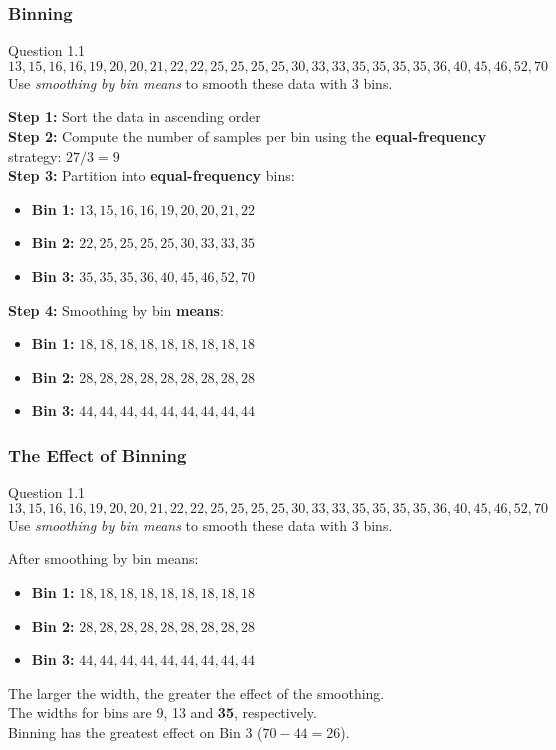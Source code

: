 \documentclass[aspectratio=169, 10pt]{beamer}
\begin{document}
\begin{frame}[t]
    \frametitle{Binning}
    \small

    \begin{block}{Question 1.1}
        \[13,15,16,16,19,20,20,21,22,22,25,25,25,25,30,33,33,35,35,35,35,36,40,45,46,52,70\]
        Use \textit{smoothing by bin means} to smooth these data with 3 bins.
    \end{block}
    \textbf{Step 1:} Sort the data in ascending order \\
    \textbf{Step 2:} Compute the number of samples per bin using the \textbf{equal-frequency} strategy: $27/3=9$\\
    \textbf{Step 3:} Partition into \textbf{equal-frequency} bins:

    \begin{itemize}
        \item \textbf{Bin 1:} $13,15,16,16,19,20,20,21,22$
        \item \textbf{Bin 2:} $22,25,25,25,25,30,33,33,35$
        \item \textbf{Bin 3:} $35,35,35,36,40,45,46,52,70$
    \end{itemize}

    \textbf{Step 4:} Smoothing by bin \textbf{means}:

    \begin{itemize}
        \item \textbf{Bin 1:} $18, 18, 18, 18, 18, 18, 18, 18, 18$
        \item \textbf{Bin 2:} $28, 28, 28, 28, 28, 28, 28, 28, 28$
        \item \textbf{Bin 3:} $44, 44, 44, 44, 44, 44, 44, 44, 44$
    \end{itemize}
\end{frame}

\begin{frame}[t]
    \frametitle{The Effect of Binning}

    \begin{block}{Question 1.1}
        \[13,15,16,16,19,20,20,21,22,22,25,25,25,25,30,33,33,35,35,35,35,36,40,45,46,52,70\]
        Use \textit{smoothing by bin means} to smooth these data with 3 bins.
    \end{block}

    After smoothing by bin means:
    \begin{itemize}
        \item \textbf{Bin 1:} $18, 18, 18, 18, 18, 18, 18, 18, 18$
        \item \textbf{Bin 2:} $28, 28, 28, 28, 28, 28, 28, 28, 28$
        \item \textbf{Bin 3:} $44, 44, 44, 44, 44, 44, 44, 44, 44$
    \end{itemize}

    The larger the width, the greater the effect of the smoothing.\\
    The widths for bins are 9, 13 and \textbf{35}, respectively.\\
    Binning has the greatest effect on Bin 3 ($70-44=26$).
\end{frame}
\end{document}
